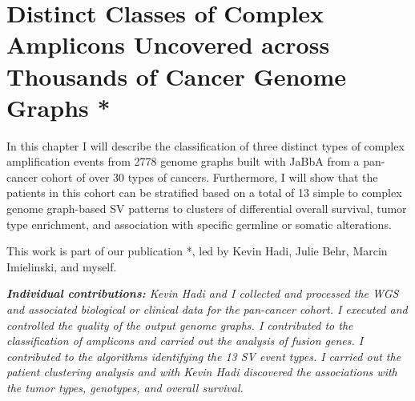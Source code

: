 \documentclass[phd,tocprelim]{cornell}
\begin{document}
\chapter{Distinct Classes of Complex Amplicons Uncovered across Thousands of Cancer Genome Graphs *} \label{chap:complex_events}
In this chapter I will describe the classification of three distinct types of complex amplification events from 2778 genome graphs built with JaBbA from a pan-cancer cohort of over 30 types of cancers. Furthermore, I will show that the patients in this cohort can be stratified based on a total of 13 simple to complex genome graph-based SV patterns to clusters of differential overall survival, tumor type enrichment, and association with specific germline or somatic alterations.

This work is part of our publication \cite{Hadi2020-um}*, led by Kevin Hadi, Julie Behr, Marcin Imielinski, and myself.

\textit{
    \textbf{Individual contributions:} Kevin Hadi and I collected and processed the WGS and associated biological or clinical data for the pan-cancer cohort. I executed and controlled the quality of the output genome graphs. I contributed to the classification of amplicons and carried out the analysis of fusion genes. I contributed to the algorithms identifying the 13 SV event types. I carried out the patient clustering analysis and with Kevin Hadi discovered the associations with the tumor types, genotypes, and overall survival.
}

\end{document}
